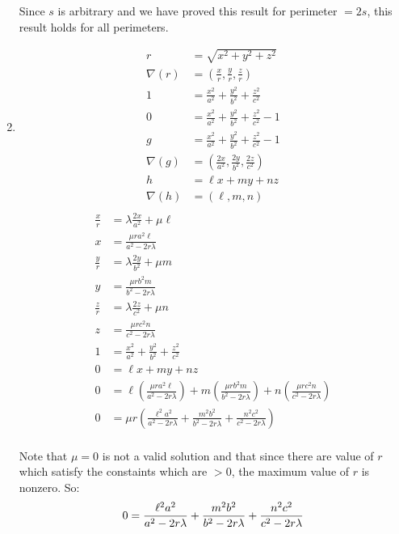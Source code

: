 \documentclass[10pt,\jkfside,a4paper]{article}
\begin{document}
\begin{enumerate}
Since $s$ is arbitrary and we have proved this result for perimeter $= 2s$, this result holds for all 
perimeters.

\item 
\begin{equation}
\begin{split}
r &= \sqrt{x^{2} + y^{2} + z^2} \\
\nabla(r) &= \left(\frac{x}{r}, \frac{y}{r}, \frac{z}{r} \right) \\
1 &= \frac{x^{2}}{a^2} + \frac{y^{2}}{b^2} + \frac{z^2}{c^2} \\ 
0 &= \frac{x^{2}}{a^2} + \frac{y^{2}}{b^2} + \frac{z^2}{c^2} - 1 \\ 
g &= \frac{x^{2}}{a^2} + \frac{y^{2}}{b^2} + \frac{z^2}{c^2} - 1 \\ 
\nabla(g) &= \left(\frac{2x}{a^2}, \frac{2y}{b^2}, \frac{2z}{c^2} \right) \\
h &= \ell x + my + nz \\
\nabla(h) &= (\ell, m, n) \\
\end{split}
\end{equation}
\begin{equation}
\begin{split}
\frac{x}{r} &= \lambda \frac{2x}{a^2}  + \mu \ell \\
x &= \frac{\mu r a^2 \ell}{a^2 - 2 r \lambda} \\
\frac{y}{r} &= \lambda \frac{2y}{b^2} + \mu m \\
y &= \frac{\mu r b^2 m}{b^2 - 2 r \lambda} \\
\frac{z}{r} &= \lambda \frac{2z}{c^2} + \mu n \\
z &= \frac{\mu r c^2 n}{c^2 - 2 r \lambda} \\
1 &= \frac{x^{2}}{a^2} + \frac{y^{2}}{b^2} + \frac{z^2}{c^2} \\
0 &= \ell x + my + nz \\
0 &= \ell \left(\frac{\mu r a^2 \ell}{a^2 - 2 r \lambda}\right) + m\left(\frac{\mu r b^2 m}{b^2 - 2 r \lambda}\right) + n\left(\frac{\mu r c^2 n}{c^2 - 2 r \lambda}\right) \\
0 &= \mu r\left(\frac{\ell^2a^2}{a^2 - 2r\lambda} + \frac{m^2b^2}{b^2 - 2r\lambda} + \frac{n^2c^2}{c^2 - 2 r \lambda} \right) \\
\end{split}
\end{equation}

Note that $\mu = 0$ is not a valid solution and that since there are value of $r$ which satisfy the 
constaints which are $> 0$, the maximum value of $r$ is nonzero. So:
\begin{equation}
0 = \frac{\ell^2a^2}{a^2 - 2r\lambda} + \frac{m^2b^2}{b^2 - 2r\lambda} + \frac{n^2c^2}{c^2 - 2 r \lambda} \\
\end{equation}


\end{enumerate}
\end{document}
